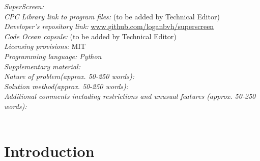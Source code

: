 \documentclass[preprint,12pt]{elsarticle}
\begin{document}
\begin{small}
\noindent
{\em SuperScreen:}\\
{\em CPC Library link to program files:} (to be added by Technical Editor) \\
{\em Developer's repository link:} \href{http://www.github.com/loganbvh/superscreen}{www.github.com/loganbvh/superscreen}\\
{\em Code Ocean capsule:} (to be added by Technical Editor)\\
{\em Licensing provisions:} MIT\\
{\em Programming language: Python}\\
{\em Supplementary material:}\\
{\em Nature of problem(approx. 50-250 words):}\\
{\em Solution method(approx. 50-250 words):}\\
{\em Additional comments including restrictions and unusual features (approx. 50-250 words):}\\
   \\

\end{small}


\section{Introduction}
\label{section:introduction}
\end{document}
